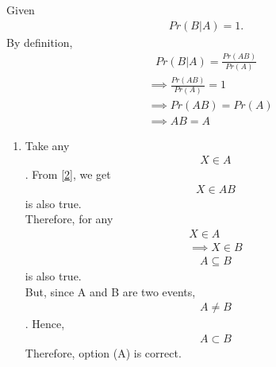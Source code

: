Given 
\begin{align}
Pr(B | A)=1. 
\end{align}
By definition,
\begin{align}
Pr(B|A)=\frac{Pr(AB)}{Pr(A)}
\end{align}
\begin{align}
&\implies\frac{Pr(AB)}{Pr(A)} = 1\\
&\implies Pr(AB) = Pr(A)\label{1}\\
&\implies AB= A\label{2}
\end{align}
\begin{enumerate}[label={\Alph*)}]
\item Take any 
\begin{align}
    X \in A
\end{align} . From \eqref{2}, we get
\begin{align}
     X \in AB
\end{align}is also true.\\
Therefore, for any 
\begin{align}
  X \in A \\
  \implies X \in B   
\end{align}
    \begin{align}
     A \subseteq B 
\end{align}is also true.\\
    But, since A and B are two events,
    \begin{align}
       A\neq B 
    \end{align}. Hence,
    \begin{align}
    A \subset B
\end{align}
Therefore, option (A) is correct.
    

\end{enumerate}
